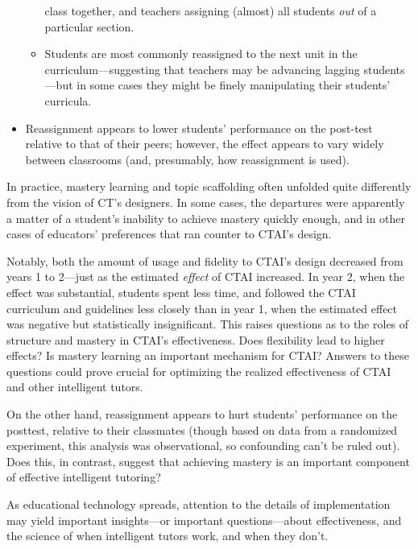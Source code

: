 \documentclass[12pt]{article}\usepackage[]{graphicx}\usepackage[]{color}
\begin{document}
\begin{itemize}
\begin{itemize}
     class together, and teachers assigning (almost) all students
     \emph{out} of a particular section.
   \item Students are most commonly reassigned to the next unit in the
     curriculum---suggesting that teachers may be advancing lagging
     students---but in some cases they might be finely manipulating
     their students' curricula.
   \end{itemize}
 \item Reassignment appears to lower students' performance on the
   post-test relative to that of their peers; however, the effect
   appears to vary widely between classrooms (and, presumably, how
   reassignment is used).
 \end{itemize}

In practice, mastery learning and topic scaffolding often unfolded
quite differently from the vision of CT's designers.
In some cases, the departures were apparently a matter of a student's inability
to achieve mastery quickly enough, and in other cases of educators' preferences that ran counter to CTAI's design.

Notably, both the amount of usage and fidelity to CTAI's design
decreased from years 1 to 2---just as the estimated \emph{effect} of
CTAI increased.
In year 2, when the effect was substantial, students spent less time,
and followed the CTAI curriculum and guidelines less closely than in
year 1, when the estimated effect was negative but statistically
insignificant.
This raises questions as to the roles of structure and mastery in
CTAI's effectiveness.
Does flexibility lead to higher effects? Is mastery learning an
important mechanism for CTAI?
Answers to these questions could prove crucial for optimizing the
realized effectiveness of CTAI and other intelligent tutors.

On the other hand, reassignment appears to hurt students' performance
on the posttest, relative to their classmates (though based on data
from a randomized experiment, this analysis was observational, so
confounding can't be ruled out).
Does this, in contrast, suggest that achieving mastery is an important
component of effective intelligent tutoring?

As educational technology spreads, attention to the details of
implementation may yield important insights---or important
questions---about effectiveness, and the science of when
intelligent tutors work, and when they don't.



\end{document}
